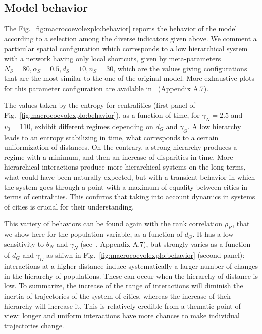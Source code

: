 \documentclass[graybox]{svmult}
\begin{document}
\subsection{Model behavior}

The Fig.~\ref{fig:macrocoevolexplo:behavior} reports the behavior of the model according to a selection among the diverse indicators given above. We comment a particular spatial configuration which corresponds to a low hierarchical system with a network having only local shortcuts, given by meta-parameters $N_S=80,\alpha_S=0.5,d_S=10,n_S=30$, which are the values giving configurations that are the most similar to the one of the original model. More exhaustive plots for this parameter configuration are available in~\cite{raimbault:tel-01857741} (Appendix A.7).



The values taken by the entropy for centralities (first panel of Fig.~\ref{fig:macrocoevolexplo:behavior}), as a function of time, for $\gamma_N = 2.5$ and $v_0 = 110$, exhibit different regimes depending on $d_G$ and $\gamma_G$. A low hierarchy leads to an entropy stabilizing in time, what corresponds to a certain uniformization of distances. On the contrary, a strong hierarchy produces a regime with a minimum, and then an increase of disparities in time. More hierarchical interactions produce more hierarchical systems on the long terms, what could have been naturally expected, but with a transient behavior in which the system goes through a point with a maximum of equality between cities in terms of centralities. This confirms that taking into account dynamics in systems of cities is crucial for their understanding.


This variety of behaviors can be found again with the rank correlation $\rho_R$, that we show here for the population variable, as a function of $d_G$. It has a low sensitivity to $\theta_N$ and $\gamma_N$ (see~\cite{raimbault:tel-01857741}, Appendix A.7), but strongly varies as a function of $d_G$ and $\gamma_G$ as shiwn in Fig.~\ref{fig:macrocoevolexplo:behavior} (second panel): interactions at a higher distance induce systematically a larger number of changes in the hierarchy of populations. These can occur when the hierarchy of distance is low. To summarize, the increase of the range of interactions will diminish the inertia of trajectories of the system of cities, whereas the increase of their hierarchy will increase it. This is relatively credible from a thematic point of view: longer and uniform interactions have more chances to make individual trajectories change.
\end{document}

